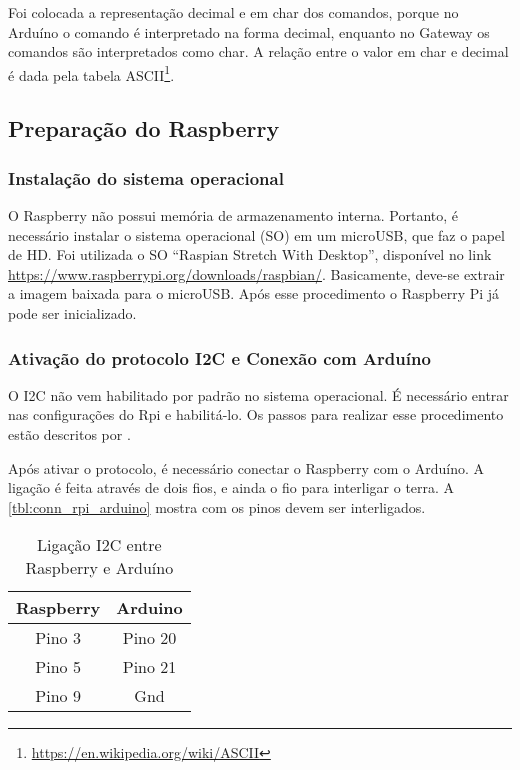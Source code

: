 		Foi colocada a representação decimal e em char dos comandos, porque no Arduíno o comando é interpretado na forma decimal, enquanto no Gateway os comandos são interpretados como char. A relação entre o valor em char e decimal é dada pela tabela ASCII\footnote{\url{https://en.wikipedia.org/wiki/ASCII}}.
		
	\subsection{Preparação do Raspberry}
		\subsubsection{Instalação do sistema operacional}
		O Raspberry não possui memória de armazenamento interna. Portanto, é necessário instalar o sistema operacional (SO) em um microUSB, que faz o papel de HD. Foi utilizada o SO ``Raspian Stretch With Desktop'', disponível no link \url{https://www.raspberrypi.org/downloads/raspbian/}. Basicamente, deve-se extrair a imagem baixada para o microUSB. Após esse procedimento o Raspberry Pi já pode ser inicializado.
		
		\subsubsection{Ativação do protocolo I2C e Conexão com Arduíno}
		O I2C não vem habilitado por padrão no sistema operacional. É necessário entrar nas configurações do Rpi e habilitá-lo. Os passos para realizar esse procedimento estão descritos por \textcite{matt2014}. 
		
		Após ativar o protocolo, é necessário conectar o Raspberry com o Arduíno. A ligação é feita através de dois fios, e ainda o fio para interligar o terra. A \autoref{tbl:conn_rpi_arduino} mostra com os pinos devem ser interligados.
		
		\begin{table}[!htb]
			\centering
			\caption{Ligação I2C entre Raspberry e Arduíno}
			\label{tbl:conn_rpi_arduino}
			\def\arraystretch{1.3}
			\begin{tabular}{c c}
				\hline
				\multicolumn{1}{c}{\textbf{Raspberry}} & \multicolumn{1}{c}{\textbf{Arduino}} \\ \hline
				
				Pino 3 & Pino 20 \\
				Pino 5 & Pino 21 \\ %
				Pino 9 & Gnd \\ %
				\hline
			\end{tabular}
		\end{table}
		
